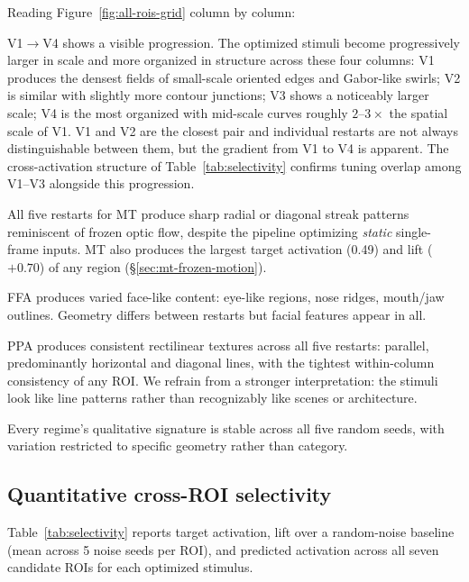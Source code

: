 \documentclass{article}
\begin{document}
Reading Figure~\ref{fig:all-rois-grid} column by column:

V1$\to$V4 shows a visible progression. The optimized stimuli become progressively larger in scale and more organized in structure across these four columns: V1 produces the densest fields of small-scale oriented edges and Gabor-like swirls; V2 is similar with slightly more contour junctions; V3 shows a noticeably larger scale; V4 is the most organized with mid-scale curves roughly $2$--$3\times$ the spatial scale of V1. V1 and V2 are the closest pair and individual restarts are not always distinguishable between them, but the gradient from V1 to V4 is apparent. The cross-activation structure of Table~\ref{tab:selectivity} confirms tuning overlap among V1--V3 alongside this progression.

All five restarts for MT produce sharp radial or diagonal streak patterns reminiscent of frozen optic flow, despite the pipeline optimizing \emph{static} single-frame inputs. MT also produces the largest target activation (0.49) and lift ($+0.70$) of any region (\S\ref{sec:mt-frozen-motion}).

FFA produces varied face-like content: eye-like regions, nose ridges, mouth/jaw outlines. Geometry differs between restarts but facial features appear in all.

PPA produces consistent rectilinear textures across all five restarts: parallel, predominantly horizontal and diagonal lines, with the tightest within-column consistency of any ROI. We refrain from a stronger interpretation: the stimuli look like line patterns rather than recognizably like scenes or architecture.

Every regime's qualitative signature is stable across all five random seeds, with variation restricted to specific geometry rather than category.

\subsection{Quantitative cross-ROI selectivity}
\label{sec:quant}

Table~\ref{tab:selectivity} reports target activation, lift over a random-noise baseline (mean across 5 noise seeds per ROI), and predicted activation across all seven candidate ROIs for each optimized stimulus.
\end{document}
